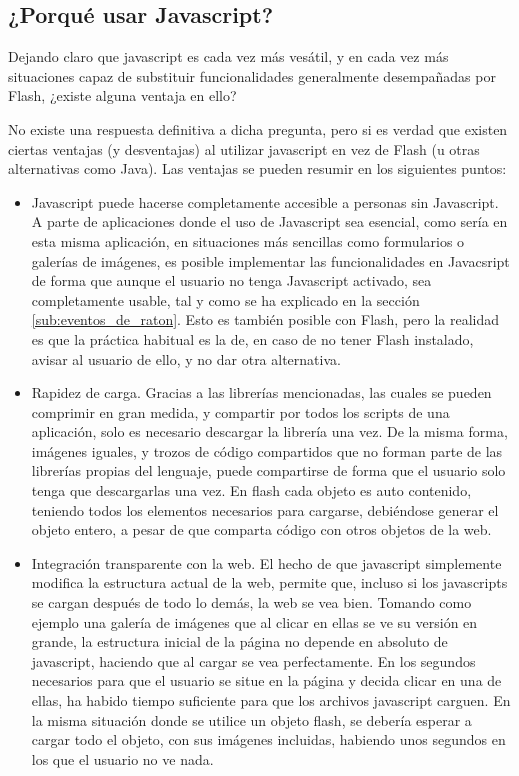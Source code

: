 \subsection{¿Porqué usar Javascript?} %
\label{sub:ventajas_de_usar_javascript}

Dejando claro que javascript es cada vez más vesátil, y en cada vez más situaciones capaz de substituir funcionalidades generalmente desempañadas por Flash, ¿existe alguna ventaja en ello?

No existe una respuesta definitiva a dicha pregunta, pero si es verdad que existen ciertas ventajas (y desventajas) al utilizar javascript en vez de Flash (u otras alternativas como Java). Las ventajas se pueden resumir en los siguientes puntos:

\begin{itemize}
  \item Javascript puede hacerse completamente accesible a personas sin Javascript. A parte de aplicaciones donde el uso de Javascript sea esencial, como sería en esta misma aplicación, en situaciones más sencillas como formularios o galerías de imágenes, es posible implementar las funcionalidades en Javacsript de forma que aunque el usuario no tenga Javascript activado, sea completamente usable, tal y como se ha explicado en la sección \ref{sub:eventos_de_raton}. Esto es también posible con Flash, pero la realidad es que la práctica habitual es la de, en caso de no tener Flash instalado, avisar al usuario de ello, y no dar otra alternativa.
  \item Rapidez de carga. Gracias a las librerías mencionadas, las cuales se pueden comprimir en gran medida, y compartir por todos los scripts de una aplicación, solo es necesario descargar la librería una vez. De la misma forma, imágenes iguales, y trozos de código compartidos que no forman parte de las librerías propias del lenguaje, puede compartirse de forma que el usuario solo tenga que descargarlas una vez. En flash cada objeto es auto contenido, teniendo todos los elementos necesarios para cargarse, debiéndose generar el objeto entero, a pesar de que comparta código con otros objetos de la web.
  \item Integración transparente con la web. El hecho de que javascript simplemente modifica la estructura actual de la web, permite que, incluso si los javascripts se cargan después de todo lo demás, la web se vea bien. Tomando como ejemplo una galería de imágenes que al clicar en ellas se ve su versión en grande, la estructura inicial de la página no depende en absoluto de javascript, haciendo que al cargar se vea perfectamente. En los segundos necesarios para que el usuario se situe en la página y decida clicar en una de ellas, ha habido tiempo suficiente para que los archivos javascript carguen. En la misma situación donde se utilice un objeto flash, se debería esperar a cargar todo el objeto, con sus imágenes incluidas, habiendo unos segundos en los que el usuario no ve nada.
\end{itemize}

